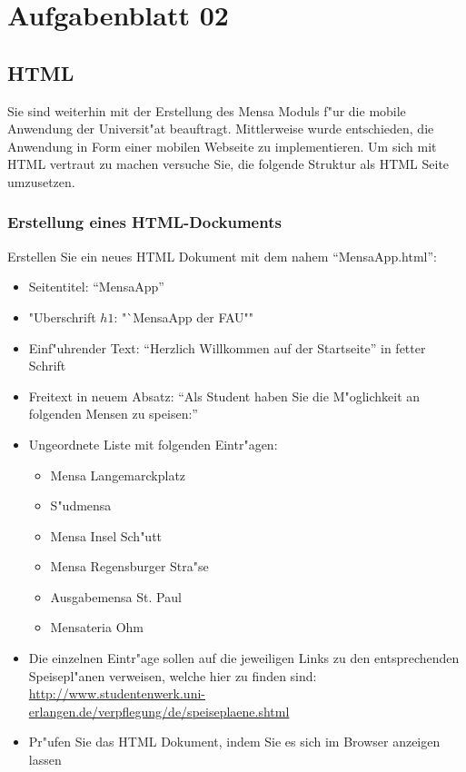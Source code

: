 
\chapter{Aufgabenblatt 02}

\section{HTML}
Sie sind weiterhin mit der Erstellung des Mensa Moduls f"ur die mobile Anwendung der Universit"at beauftragt.
Mittlerweise wurde entschieden, die Anwendung in Form einer mobilen Webseite zu implementieren.
Um sich mit HTML vertraut zu machen versuche Sie, die folgende Struktur als HTML Seite umzusetzen.

\subsection{Erstellung eines HTML-Dockuments}
Erstellen Sie ein neues HTML Dokument mit dem nahem "`MensaApp.html"':
\begin{itemize}
    \item Seitentitel: "`MensaApp"'
    \item "Uberschrift $h1$: "`MensaApp der FAU""
    \item Einf"uhrender Text: "`Herzlich Willkommen auf der Startseite"' in fetter Schrift
    \item Freitext in neuem Absatz: "`Als Student haben Sie die M"oglichkeit an folgenden Mensen zu speisen:"'
    \item Ungeordnete Liste mit folgenden Eintr"agen:
    \begin{itemize}
        \item Mensa Langemarckplatz
        \item S"udmensa
        \item Mensa Insel Sch"utt
        \item Mensa Regensburger Stra"se
        \item Ausgabemensa St. Paul
        \item Mensateria Ohm
    \end{itemize}
    \item Die einzelnen Eintr"age sollen auf die jeweiligen Links zu den entsprechenden Speisepl"anen verweisen, welche hier zu finden sind: \url{http://www.studentenwerk.uni-erlangen.de/verpflegung/de/speiseplaene.shtml}
    \item Pr"ufen Sie das HTML Dokument, indem Sie es sich im Browser anzeigen lassen
\end{itemize}

\lstset{style=customHTML}


